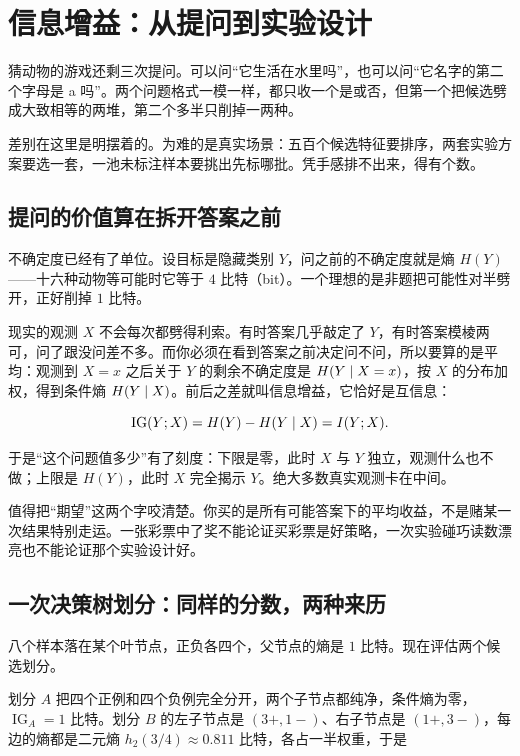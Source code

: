 \section{信息增益：从提问到实验设计}
\label{sec:07-Information-Theory/06-Information-and-Learning/01}

猜动物的游戏还剩三次提问。可以问``它生活在水里吗''，也可以问``它名字的第二个字母是 a 吗''。两个问题格式一模一样，都只收一个是或否，但第一个把候选劈成大致相等的两堆，第二个多半只削掉一两种。

差别在这里是明摆着的。为难的是真实场景：五百个候选特征要排序，两套实验方案要选一套，一池未标注样本要挑出先标哪批。凭手感排不出来，得有个数。

\subsection{提问的价值算在拆开答案之前}

不确定度已经有了单位。设目标是隐藏类别 \(Y\)，问之前的不确定度就是熵 \(H(Y)\)——十六种动物等可能时它等于 \(4\) 比特（bit）。一个理想的是非题把可能性对半劈开，正好削掉 \(1\) 比特。

现实的观测 \(X\) 不会每次都劈得利索。有时答案几乎敲定了 \(Y\)，有时答案模棱两可，问了跟没问差不多。而你必须在看到答案之前决定问不问，所以要算的是平均：观测到 \(X=x\) 之后关于 \(Y\) 的剩余不确定度是 \(H(Y\mid X=x)\)，按 \(X\) 的分布加权，得到条件熵 \(H(Y\mid X)\)。前后之差就叫信息增益，它恰好是互信息：

\[
\operatorname{IG}(Y;X)=H(Y)-H(Y\mid X)=I(Y;X).
\]

于是``这个问题值多少''有了刻度：下限是零，此时 \(X\) 与 \(Y\) 独立，观测什么也不做；上限是 \(H(Y)\)，此时 \(X\) 完全揭示 \(Y\)。绝大多数真实观测卡在中间。

值得把``期望''这两个字咬清楚。你买的是所有可能答案下的平均收益，不是赌某一次结果特别走运。一张彩票中了奖不能论证买彩票是好策略，一次实验碰巧读数漂亮也不能论证那个实验设计好。

\subsection{一次决策树划分：同样的分数，两种来历}

八个样本落在某个叶节点，正负各四个，父节点的熵是 \(1\) 比特。现在评估两个候选划分。

划分 \(A\) 把四个正例和四个负例完全分开，两个子节点都纯净，条件熵为零，\(\operatorname{IG}_A=1\) 比特。划分 \(B\) 的左子节点是 \((3+,1-)\)、右子节点是 \((1+,3-)\)，每边的熵都是二元熵 \(h_2(3/4)\approx0.811\) 比特，各占一半权重，于是

